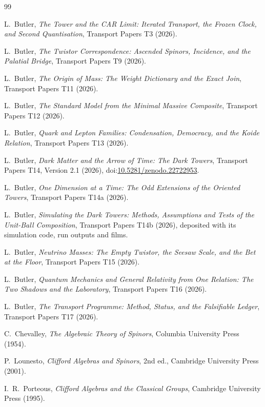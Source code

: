 \documentclass[11pt]{article}
\theoremstyle{definition}
\begin{document}
\begin{thebibliography}{99}

L.~Butler,
\emph{The Tower and the CAR Limit: Iterated Transport, the Frozen Clock, and Second Quantisation},
Transport Papers T3 (2026).

L.~Butler,
\emph{The Twistor Correspondence: Ascended Spinors, Incidence, and the Palatial Bridge},
Transport Papers T9 (2026).

L.~Butler,
\emph{The Origin of Mass: The Weight Dictionary and the Exact Join},
Transport Papers T11 (2026).

L.~Butler,
\emph{The Standard Model from the Minimal Massive Composite},
Transport Papers T12 (2026).

L.~Butler,
\emph{Quark and Lepton Families: Condensation, Democracy, and the Koide Relation},
Transport Papers T13 (2026).

L.~Butler,
\emph{Dark Matter and the Arrow of Time: The Dark Towers},
Transport Papers T14, Version 2.1 (2026), doi:\href{https://doi.org/10.5281/zenodo.22722953}{10.5281/zenodo.22722953}.

L.~Butler,
\emph{One Dimension at a Time: The Odd Extensions of the Oriented Towers},
Transport Papers T14a (2026).

L.~Butler,
\emph{Simulating the Dark Towers: Methods, Assumptions and Tests of the Unit-Ball Composition},
Transport Papers T14b (2026), deposited with its simulation code, run outputs and films.

L.~Butler,
\emph{Neutrino Masses: The Empty Twistor, the Seesaw Scale, and the Bet at the Floor},
Transport Papers T15 (2026).

L.~Butler,
\emph{Quantum Mechanics and General Relativity from One Relation: The Two Shadows and the Laboratory},
Transport Papers T16 (2026).

L.~Butler,
\emph{The Transport Programme: Method, Status, and the Falsifiable Ledger},
Transport Papers T17 (2026).

C.~Chevalley,
\emph{The Algebraic Theory of Spinors},
Columbia University Press (1954).

P.~Lounesto,
\emph{Clifford Algebras and Spinors}, 2nd ed.,
Cambridge University Press (2001).

I.~R.~Porteous,
\emph{Clifford Algebras and the Classical Groups},
Cambridge University Press (1995).


\end{thebibliography}
\end{document}
